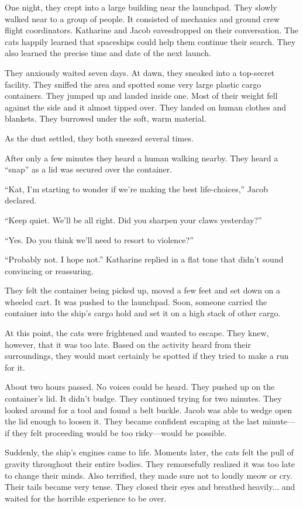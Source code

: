 One night, they crept into a large building near the launchpad. They slowly walked near to a group of people. It consisted of mechanics and ground crew flight coordinators. Katharine and Jacob eavesdropped on their conversation. The cats happily learned that spaceships could help them continue their search. They also learned the precise time and date of the next launch.

They anxiously waited seven days. At dawn, they sneaked into a top-secret facility. They sniffed the area and spotted some very large plastic cargo containers. They jumped up and landed inside one. Most of their weight fell against the side and it almost tipped over. They landed on human clothes and blankets. They burrowed under the soft, warm material.

As the dust settled, they both sneezed several times.

After only a few minutes they heard a human walking nearby. They heard a “snap” as a lid was secured over the container.

“Kat, I'm starting to wonder if we're making the best life-choices,” Jacob declared.

“Keep quiet. We'll be all right. Did you sharpen your claws yesterday?”

“Yes. Do you think we'll need to resort to violence?”

“Probably not. I hope not.” Katharine replied in a flat tone that didn't sound convincing or reassuring.

They felt the container being picked up, moved a few feet and set down on a wheeled cart. It was pushed to the launchpad. Soon, someone carried the container into the ship's cargo hold and set it on a high stack of other cargo.

At this point, the cats were frightened and wanted to escape. They knew, however, that it was too late. Based on the activity heard from their surroundings, they would most certainly be spotted if they tried to make a run for it.

About two hours passed. No voices could be heard. They pushed up on the container's lid. It didn't budge. They continued trying for two minutes. They looked around for a tool and found a belt buckle. Jacob was able to wedge open the lid enough to loosen it. They became confident escaping at the last minute—if they felt proceeding would be too risky—would be possible.

Suddenly, the ship's engines came to life. Moments later, the cats felt the pull of gravity throughout their entire bodies. They remorsefully realized it was too late to change their minds. Also terrified, they made sure not to loudly meow or cry. Their tails became very tense. They closed their eyes and breathed heavily... and waited for the horrible experience to be over.

